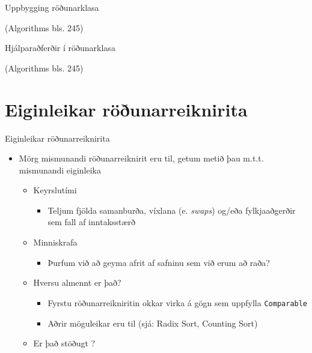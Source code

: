 \documentclass{beamer}
\begin{document}
\begin{frame}{Uppbygging röðunarklasa}

	(Algorithms bls. 245)
\end{frame}

\begin{frame}{Hjálparaðferðir í röðunarklasa}

	(Algorithms bls. 245)
\end{frame}

\section{Eiginleikar röðunarreiknirita}

\begin{frame}{Eiginleikar röðunarreiknirita}
	\begin{itemize}
		\item Mörg mismunandi röðunarreiknirit eru til, getum metið þau m.t.t. mismunandi eiginleika
		      \begin{itemize}
			      \item Keyrslutími
			            \begin{itemize}
				            \item Teljum fjölda samanburða, víxlana (e. \emph{swaps}) og/eða fylkjaaðgerðir sem fall af inntaksstærð
			            \end{itemize}
			      \item Minniskrafa
			            \begin{itemize}
				            \item Þurfum við að geyma afrit af safninu sem við erum að raða?
			            \end{itemize}
			      \item Hversu almennt er það?
			            \begin{itemize}
				            \item Fyrstu röðunarreikniritin okkar virka á gögn sem uppfylla \texttt{Comparable}
				            \item Aðrir möguleikar eru til (sjá: Radix Sort, Counting Sort)
			            \end{itemize}
			      \item Er það stöðugt ?
		      \end{itemize}
	\end{itemize}
\end{frame}
\end{document}
